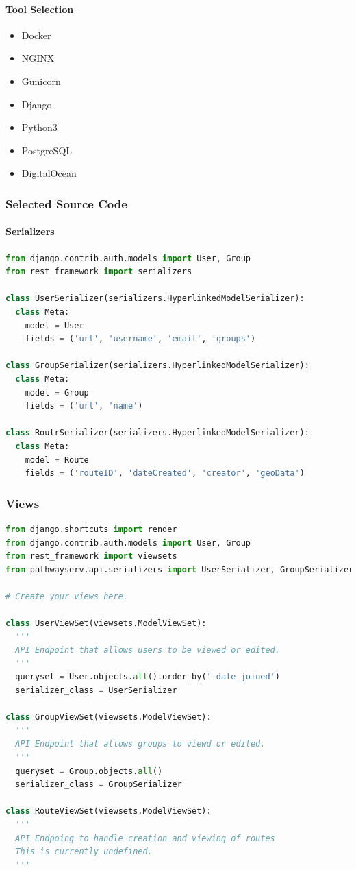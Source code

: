 \documentclass{article}
\begin{document}
\paragraph{Tool Selection}
\begin{itemize}
    \item Docker
    \item NGINX
    \item Gunicorn
    \item Django
    \item Python3
    \item PostgreSQL
    \item DigitalOcean
\end{itemize}

\subsubsection{Selected Source Code}
\paragraph{Serializers}
\begin{lstlisting}[language=Python]
from django.contrib.auth.models import User, Group
from rest_framework import serializers

class UserSerializer(serializers.HyperlinkedModelSerializer):
  class Meta:
    model = User
    fields = ('url', 'username', 'email', 'groups')

class GroupSerializer(serializers.HyperlinkedModelSerializer):
  class Meta:
    model = Group
    fields = ('url', 'name')

class RoutrSerializer(serializers.HyperlinkedModelSerializer):
  class Meta:
    model = Route
    fields = ('routeID', 'dateCreated', 'creator', 'geoData')
\end{lstlisting}

\subsubsection{Views}
\begin{lstlisting}[language=Python]
from django.shortcuts import render
from django.contrib.auth.models import User, Group
from rest_framework import viewsets
from pathwayserv.api.serializers import UserSerializer, GroupSerializer

# Create your views here.

class UserViewSet(viewsets.ModelViewSet):
  '''
  API Endpoint that allows users to be viewed or edited.
  '''
  queryset = User.objects.all().order_by('-date_joined')
  serializer_class = UserSerializer

class GroupViewSet(viewsets.ModelViewSet):
  '''
  API Endpoint that allows groups to viewd or edited.
  '''
  queryset = Group.objects.all()
  serializer_class = GroupSerializer

class RouteViewSet(viewsets.ModelViewSet):
  '''
  API Endpoing to handle creation and viewing of routes
  This is currently undefined.
  '''
\end{lstlisting}
\end{document}
